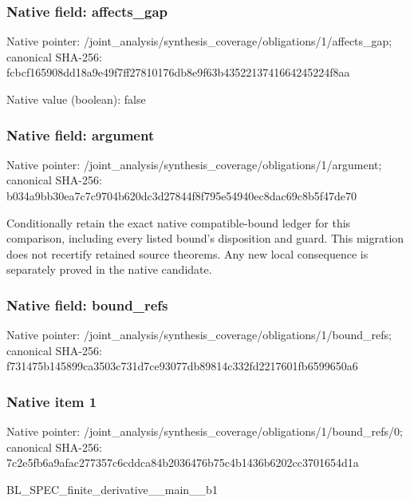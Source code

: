 \documentclass[10pt,a4paper]{article}
\begin{document}
\subsubsection{Native field: affects\_\allowbreak{}gap}
Native pointer: /joint\_\allowbreak{}analysis/synthesis\_\allowbreak{}coverage/obligations/1/affects\_\allowbreak{}gap; canonical SHA-256: fcbcf165908dd18a9e49f7ff27810176db8e9f63b4352213741664245224f8aa

Native value (boolean): false

\subsubsection{Native field: argument}
Native pointer: /joint\_\allowbreak{}analysis/synthesis\_\allowbreak{}coverage/obligations/1/argument; canonical SHA-256: b034a9bb30ea7c7c9704b620dc3d27844f8f795e54940ec8dac69c8b5f47de70

\begingroup\raggedright\sloppy Conditionally retain the exact native compatible-bound ledger for this comparison,\allowbreak{} including every listed bound's disposition and guard. This migration does not recertify retained source theorems. Any new local consequence is separately proved in the native candidate.\par\endgroup

\subsubsection{Native field: bound\_\allowbreak{}refs}
Native pointer: /joint\_\allowbreak{}analysis/synthesis\_\allowbreak{}coverage/obligations/1/bound\_\allowbreak{}refs; canonical SHA-256: f731475b145899ca3503c731d7ce93077db89814c332fd2217601fb6599650a6

\subsubsection{Native item 1}
Native pointer: /joint\_\allowbreak{}analysis/synthesis\_\allowbreak{}coverage/obligations/1/bound\_\allowbreak{}refs/0; canonical SHA-256: 7c2e5fb6a9afac277357c6cddca84b2036476b75c4b1436b6202cc3701654d1a

\begingroup\raggedright\sloppy BL\_\allowbreak{}SPEC\_\allowbreak{}finite\_\allowbreak{}derivative\_\allowbreak{}\_\allowbreak{}main\_\allowbreak{}\_\allowbreak{}b1\par\endgroup
\end{document}
